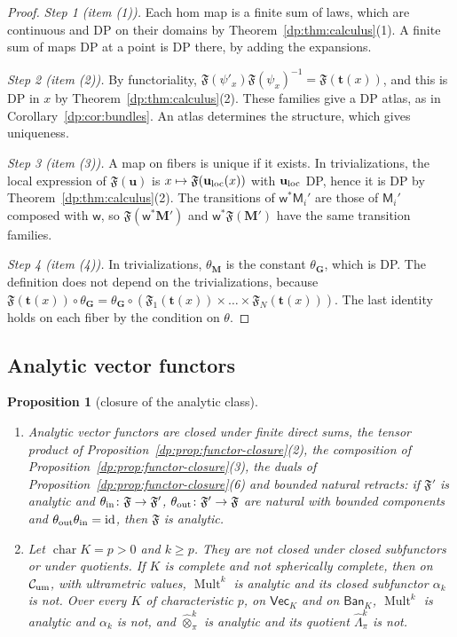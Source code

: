 \documentclass[11pt]{amsart}
\newtheorem{proposition}[theorem]{Proposition}
\theoremstyle{definition}
\theoremstyle{remark}
\numberwithin{equation}{section}
\newcommand{\Mult}{\operatorname{Mult}}
\newcommand{\id}{\mathrm{id}}
\newcommand{\cC}{\mathcal{C}}
\theoremstyle{plain}
\theoremstyle{definition}
\theoremstyle{plain}
\newcommand{\hot}{\mathbin{\widehat\otimes}}
\newcommand{\hLambda}{\widehat\Lambda}
\begin{document}
\begin{proof}
\emph{Step 1 (item (1)).} Each hom map is a finite sum of laws, which are continuous and DP on their domains by Theorem~\ref{dp:thm:calculus}(1). A finite sum of maps DP at a point is DP there, by adding the expansions.

\emph{Step 2 (item (2)).} By functoriality, $\mathfrak F(\psi'_x)\mathfrak F(\psi_x)^{-1}=\mathfrak F(\mathbf t(x))$, and this is DP in $x$ by Theorem~\ref{dp:thm:calculus}(2). These families give a DP atlas, as in Corollary~\ref{dp:cor:bundles}. An atlas determines the structure, which gives uniqueness.

\emph{Step 3 (item (3)).} A map on fibers is unique if it exists. In trivializations, the local expression of $\mathfrak F(\mathbf u)$ is $x\mapsto\mathfrak F(\mathbf u_{\rm loc}(x))$ with $\mathbf u_{\rm loc}$ DP, hence it is DP by Theorem~\ref{dp:thm:calculus}(2). The transitions of $\mathsf w^*\mathsf M_i'$ are those of $\mathsf M_i'$ composed with $\mathsf w$, so $\mathfrak F(\mathsf w^*\mathbf M')$ and $\mathsf w^*\mathfrak F(\mathbf M')$ have the same transition families.

\emph{Step 4 (item (4)).} In trivializations, $\theta_{\mathbf M}$ is the constant $\theta_{\mathbf G}$, which is DP. The definition does not depend on the trivializations, because $\mathfrak F(\mathbf t(x))\circ\theta_{\mathbf G}=\theta_{\mathbf G}\circ(\mathfrak F_1(\mathbf t(x))\times\dots\times\mathfrak F_N(\mathbf t(x)))$. The last identity holds on each fiber by the condition on $\theta$.
\end{proof}

\subsection{Analytic vector functors}

\begin{proposition}[closure of the analytic class]\label{dp:prop:analytic-closure}
\leavevmode
\begin{enumerate}
\item Analytic vector functors are closed under finite direct sums, the tensor product of Proposition~\ref{dp:prop:functor-closure}\textup{(2)}, the composition of Proposition~\ref{dp:prop:functor-closure}\textup{(3)}, the duals of Proposition~\ref{dp:prop:functor-closure}\textup{(6)} and bounded natural retracts: if $\mathfrak F'$ is analytic and $\theta_{\rm in}\colon\mathfrak F\to\mathfrak F'$, $\theta_{\rm out}\colon\mathfrak F'\to\mathfrak F$ are natural with bounded components and $\theta_{\rm out}\theta_{\rm in}=\id$, then $\mathfrak F$ is analytic.
\item Let $\operatorname{char}K=p>0$ and $k\ge p$. They are not closed under closed subfunctors or under quotients. If $K$ is complete and not spherically complete, then on $\cC_{\rm um}$, with ultrametric values, $\Mult^k$ is analytic and its closed subfunctor $\alpha_k$ is not. Over every $K$ of characteristic $p$, on $\mathsf{Vec}_K$ and on $\mathsf{Ban}_K$, $\Mult^k$ is analytic and $\alpha_k$ is not, and $\hot^k_\pi$ is analytic and its quotient $\hLambda^k_\pi$ is not.
\end{enumerate}
\end{proposition}
\end{document}
